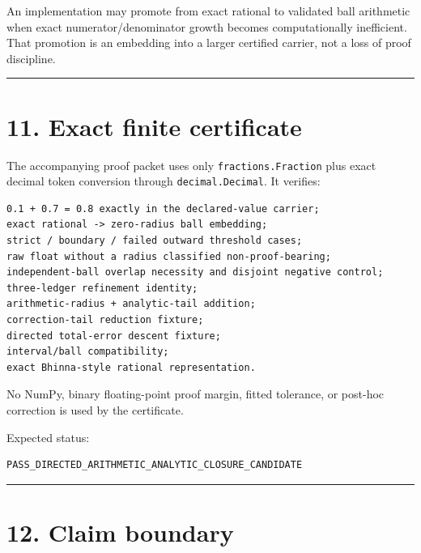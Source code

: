 An implementation may promote from exact rational to validated ball arithmetic
when exact numerator/denominator growth becomes computationally inefficient.
That promotion is an embedding into a larger certified carrier, not a loss of
proof discipline.

\begin{center}\rule{0.5\linewidth}{0.5pt}\end{center}

\hypertarget{exact-finite-certificate}{%
\section{11. Exact finite certificate}\label{exact-finite-certificate}}

The accompanying proof packet uses only \texttt{fractions.Fraction} plus exact decimal
token conversion through \texttt{decimal.Decimal}. It verifies:

\begin{verbatim}
0.1 + 0.7 = 0.8 exactly in the declared-value carrier;
exact rational -> zero-radius ball embedding;
strict / boundary / failed outward threshold cases;
raw float without a radius classified non-proof-bearing;
independent-ball overlap necessity and disjoint negative control;
three-ledger refinement identity;
arithmetic-radius + analytic-tail addition;
correction-tail reduction fixture;
directed total-error descent fixture;
interval/ball compatibility;
exact Bhinna-style rational representation.
\end{verbatim}

No NumPy, binary floating-point proof margin, fitted tolerance, or post-hoc
correction is used by the certificate.

Expected status:

\begin{verbatim}
PASS_DIRECTED_ARITHMETIC_ANALYTIC_CLOSURE_CANDIDATE
\end{verbatim}

\begin{center}\rule{0.5\linewidth}{0.5pt}\end{center}

\hypertarget{claim-boundary}{%
\section{12. Claim boundary}\label{claim-boundary}}


